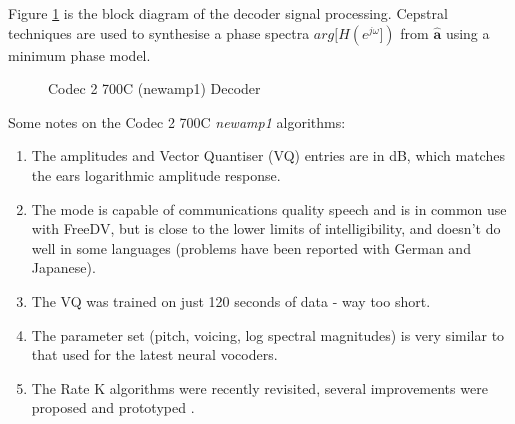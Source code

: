 \documentclass{article}
\begin{document}
Figure \ref{fig:decoder_newamp1} is the block diagram of the decoder signal processing.  Cepstral techniques are used to synthesise a  phase spectra $arg[H(e^{j \omega}])$ from $\hat{\mathbf{a}}$ using a minimum phase model.  

\begin{figure}[h]
\caption{Codec 2 700C (newamp1) Decoder}
\label{fig:decoder_newamp1}
\begin{center}
\end{center}
\end{figure}

Some notes on the Codec 2 700C \emph{newamp1} algorithms:
\begin{enumerate}
\item The amplitudes and Vector Quantiser (VQ) entries are in dB, which matches the ears logarithmic amplitude response. 
\item The mode is capable of communications quality speech and is in common use with FreeDV, but is close to the lower limits of intelligibility, and doesn't do well in some languages (problems have been reported with German and Japanese).
\item The VQ was trained on just 120 seconds of data - way too short.
\item The parameter set (pitch, voicing, log spectral magnitudes) is very similar to that used for the latest neural vocoders.
\item The Rate K algorithms were recently revisited, several improvements were proposed and prototyped \cite{rowe2023ratek}.
\end{enumerate}
\end{document}
